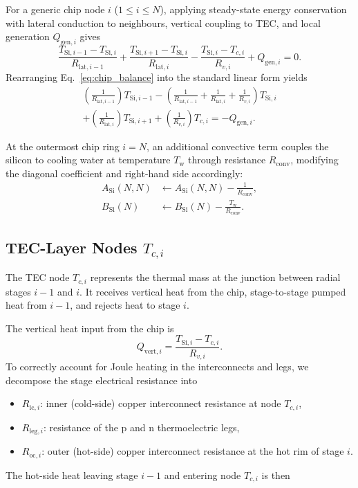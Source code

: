 \documentclass[conference]{IEEEtran}
\begin{document}
For a generic chip node $i$ ($1 \le i \le N$), applying steady-state energy conservation with lateral conduction to neighbours, vertical coupling to TEC, and local generation $Q_{\text{gen},i}$ gives
\begin{equation}
	\frac{T_{\text{Si},i-1} - T_{\text{Si},i}}{R_{\text{lat},i-1}}
	+ \frac{T_{\text{Si},i+1} - T_{\text{Si},i}}{R_{\text{lat},i}}
	- \frac{T_{\text{Si},i} - T_{c,i}}{R_{v,i}}
	+ Q_{\text{gen},i} = 0.
	\label{eq:chip_balance}
\end{equation}
Rearranging Eq.~\eqref{eq:chip_balance} into the standard linear form yields
\begin{multline}
	\left( \frac{1}{R_{\text{lat},i-1}} \right) T_{\text{Si},i-1}
	- \left( \frac{1}{R_{\text{lat},i-1}} + \frac{1}{R_{\text{lat},i}} + \frac{1}{R_{v,i}} \right) T_{\text{Si},i} \\
	+ \left( \frac{1}{R_{\text{lat},i}} \right) T_{\text{Si},i+1}
	+ \left( \frac{1}{R_{v,i}} \right) T_{c,i} = - Q_{\text{gen},i}.
	\label{eq:chip_coeff}
\end{multline}

At the outermost chip ring $i=N$, an additional convective term couples the silicon to cooling water at temperature $T_{\text{w}}$ through resistance $R_{\text{conv}}$, modifying the diagonal coefficient and right-hand side accordingly:
\begin{align}
	A_{\text{Si}}(N,N) &\leftarrow A_{\text{Si}}(N,N) - \frac{1}{R_{\text{conv}}}, \\
	B_{\text{Si}}(N) &\leftarrow B_{\text{Si}}(N) - \frac{T_{\text{w}}}{R_{\text{conv}}}.
	\label{eq:bc_chip_outer}
\end{align}

\subsection{TEC-Layer Nodes $T_{c,i}$}

The TEC node $T_{c,i}$ represents the thermal mass at the junction between radial stages $i-1$ and $i$. It receives vertical heat from the chip, stage-to-stage pumped heat from $i-1$, and rejects heat to stage $i$.

The vertical heat input from the chip is
\begin{equation}
	Q_{\text{vert},i} = \frac{T_{\text{Si},i} - T_{c,i}}{R_{v,i}}.
	\label{eq:Q_vert}
\end{equation}
To correctly account for Joule heating in the interconnects and legs, we decompose the stage electrical resistance into
\begin{itemize}
	\item $R_{\text{ic},i}$: inner (cold-side) copper interconnect resistance at node $T_{c,i}$,
	\item $R_{\text{leg},i}$: resistance of the p and n thermoelectric legs,
	\item $R_{\text{oc},i}$: outer (hot-side) copper interconnect resistance at the hot rim of stage $i$.
\end{itemize}
The hot-side heat leaving stage $i-1$ and entering node $T_{c,i}$ is then
\end{document}
